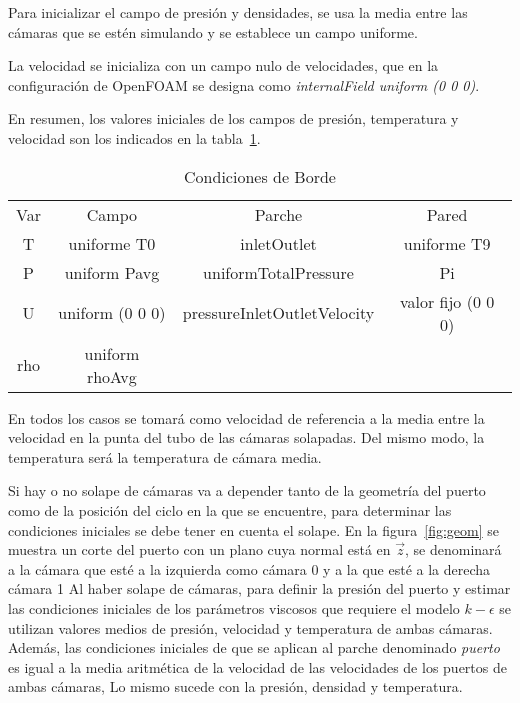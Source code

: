 Para inicializar el campo de presión y densidades, se usa la media entre las
cámaras que se estén simulando y se establece un campo uniforme.

La velocidad se inicializa con un campo nulo de velocidades, que en la
configuración de OpenFOAM se designa como \emph{internalField uniform (0 0 0)}.

En resumen, los valores iniciales de los campos de presión, temperatura y velocidad
son los indicados en la tabla~\ref{tab:cc}.

\begin{table}
\centering
    \begin{tabular}{cccc} \toprule
        Var & Campo         & Parche                      & Pared \\
        T   & uniforme T0   & inletOutlet                 & uniforme T9\\ \midrule
        P   & uniform Pavg  & uniformTotalPressure        & Pi \\
        U   & uniform (0 0 0) & pressureInletOutletVelocity & valor fijo (0 0 0)\\
        rho & uniform rhoAvg \\ \bottomrule
    \end{tabular}
    \caption{Condiciones de Borde}\label{tab:cc}
\end{table}

En todos los casos se tomará como velocidad de referencia a la media entre la
velocidad en la punta del tubo de las cámaras solapadas.
%
Del mismo modo, la temperatura será la temperatura de cámara media.

Si hay o no solape de cámaras va a depender tanto de la geometría del puerto
como de la posición del ciclo en la que se encuentre, para determinar las
condiciones iniciales se debe tener en cuenta el solape.
%
En la figura~\ref{fig:geom} se muestra un corte del puerto con un plano cuya
normal está en $\vec{z}$, se denominará a la cámara que esté a la izquierda
como cámara 0 y a la que esté a la derecha cámara 1
%
Al haber solape de cámaras, para definir la presión del puerto y estimar las
condiciones iniciales de los parámetros viscosos que requiere el modelo
$k-\epsilon$ se utilizan valores medios de presión, velocidad y temperatura de
ambas cámaras.
%
Además, las condiciones iniciales de que se aplican al parche denominado
\emph{puerto} es igual a la media aritmética de la velocidad de las velocidades
de los puertos de ambas cámaras, Lo mismo sucede con la presión, densidad y
temperatura.

